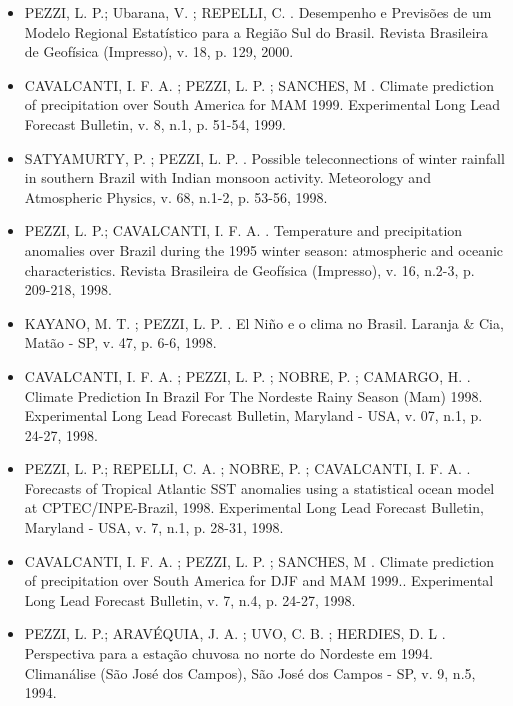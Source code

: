 \documentclass[11pt, a4paper]{awesome-cv}
\begin{document}
\begin{cvletter}
\begin{itemize}
  \item[] PEZZI, L. P.; Ubarana, V. ; REPELLI, C. . Desempenho e Previsões de um Modelo Regional 
  Estatístico para a Região Sul do Brasil. Revista Brasileira de Geofísica (Impresso), v. 18, 
  p. 129, 2000. 

  \item[] CAVALCANTI, I. F. A. ; PEZZI, L. P. ; SANCHES, M . Climate prediction of precipitation 
  over South America for MAM 1999. Experimental Long Lead Forecast Bulletin, v. 8, n.1, p. 
  51-54, 1999. 

  \item[] SATYAMURTY, P. ; PEZZI, L. P. . Possible teleconnections of winter rainfall in southern 
  Brazil with Indian monsoon activity. Meteorology and Atmospheric Physics, v. 68, n.1-2, p. 
  53-56, 1998. 

  \item[] PEZZI, L. P.; CAVALCANTI, I. F. A. . Temperature and precipitation anomalies over Brazil
  during the 1995 winter season: atmospheric and oceanic characteristics. Revista Brasileira de 
  Geofísica (Impresso), v. 16, n.2-3, p. 209-218, 1998. 
  
  \item[] KAYANO, M. T. ; PEZZI, L. P. . El Niño e o clima no Brasil. Laranja \& Cia, Matão - SP, v. 
  47, p. 6-6, 1998. 

  \item[] CAVALCANTI, I. F. A. ; PEZZI, L. P. ; NOBRE, P. ; CAMARGO, H. . Climate Prediction In Brazil 
  For The Nordeste Rainy Season (Mam) 1998. Experimental Long Lead Forecast Bulletin, Maryland - 
  USA, v. 07, n.1, p. 24-27, 1998. 

  \item[] PEZZI, L. P.; REPELLI, C. A. ; NOBRE, P. ; CAVALCANTI, I. F. A. . Forecasts of Tropical 
  Atlantic SST anomalies using a statistical ocean model at CPTEC/INPE-Brazil, 1998. Experimental 
  Long Lead Forecast Bulletin, Maryland - USA, v. 7, n.1, p. 28-31, 1998. 

  \item[] 
  CAVALCANTI, I. F. A. ; PEZZI, L. P. ; SANCHES, M . Climate prediction of precipitation over South 
  America for DJF and MAM 1999.. Experimental Long Lead Forecast Bulletin, v. 7, n.4, p. 24-27, 
  1998. 

  \item[] PEZZI, L. P.; ARAVÉQUIA, J. A. ; UVO, C. B. ; HERDIES, D. L . 
  Perspectiva para a estação chuvosa no norte do Nordeste em 1994. Climanálise (São José dos Campos), 
  São José dos Campos - SP, v. 9, n.5, 1994. 


\end{itemize}
\end{cvletter}
\end{document}
